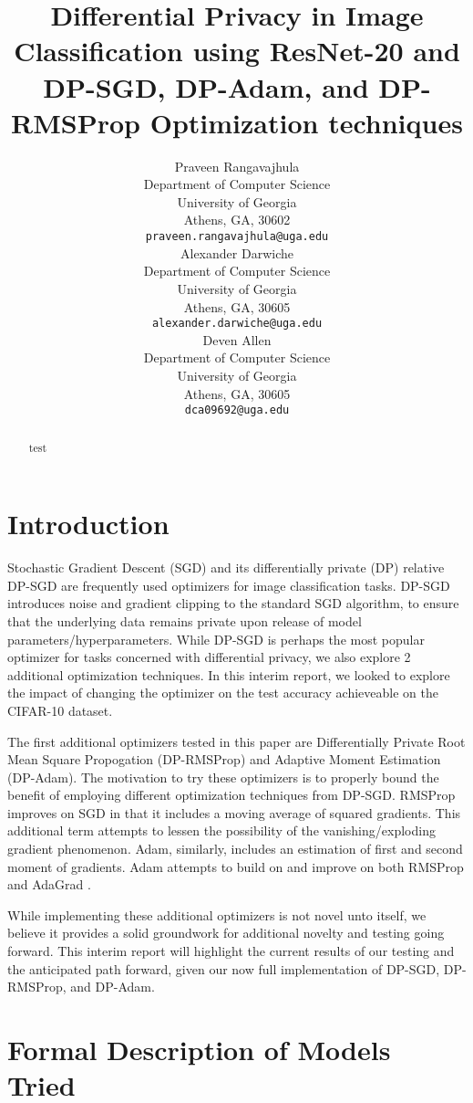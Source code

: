 \documentclass{article}
\title{Differential Privacy in Image Classification using ResNet-20 and DP-SGD, DP-Adam, and DP-RMSProp Optimization techniques}
\author{
    Praveen Rangavajhula\\
    Department of Computer Science\\
    University of Georgia\\
    Athens, GA, 30602\\
    \texttt{praveen.rangavajhula@uga.edu} \\
    \And
    Alexander Darwiche\\
    Department of Computer Science\\
    University of Georgia\\
    Athens, GA, 30605 \\
    \texttt{alexander.darwiche@uga.edu} \\
    \And
    Deven Allen\\
    Department of Computer Science\\
    University of Georgia\\
    Athens, GA, 30605 \\
    \texttt{dca09692@uga.edu} \\
}
\begin{document}
    \maketitle
    \begin{abstract}
    test

    \end{abstract}


    \section{Introduction}\label{sec:introduction}
    
    Stochastic Gradient Descent (SGD) and its differentially private (DP) relative DP-SGD are frequently used optimizers for image classification tasks. DP-SGD
    introduces noise and gradient clipping to the standard SGD algorithm, to ensure that the underlying data remains private upon release of model parameters/hyperparameters. While DP-SGD
    is perhaps the most popular optimizer for tasks concerned with differential privacy, we also explore 2 additional optimization techniques. In this interim report, 
    we looked to explore the impact of changing the optimizer on the test accuracy achieveable on the CIFAR-10 dataset.
  
    The first additional optimizers tested in this paper are Differentially Private Root Mean Square Propogation (DP-RMSProp) and Adaptive Moment Estimation (DP-Adam). The motivation to try these optimizers is to properly bound
    the benefit of employing different optimization techniques from DP-SGD. RMSProp improves on SGD in that it includes a moving average of squared gradients. This additional term attempts to lessen the possibility of the
    vanishing/exploding gradient phenomenon. Adam, similarly, includes an estimation of first and second moment of gradients. Adam attempts to build on and improve on both RMSProp and AdaGrad \cite{kingma2017adammethodstochasticoptimization}.

    While implementing these additional optimizers is not novel unto itself, we believe it provides a solid groundwork for additional novelty and testing going forward. This interim report will
    highlight the current results of our testing and the anticipated path forward, given our now full implementation of DP-SGD, DP-RMSProp, and DP-Adam.

    \section{Formal Description of Models Tried}\label{sec:models}
\end{document}
